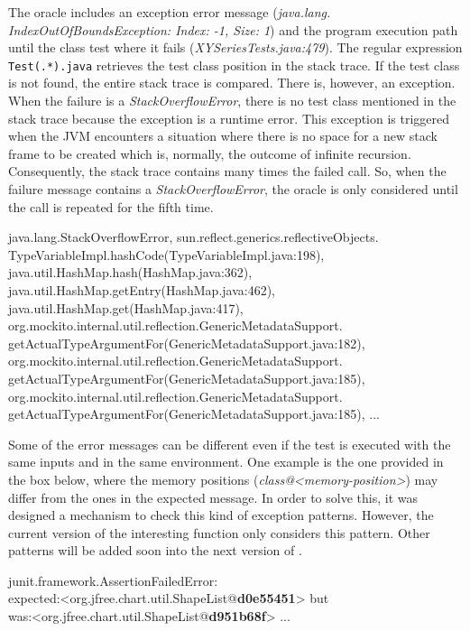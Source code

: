 \documentclass{article}
\begin{document}
The oracle includes an exception error message (\emph{java.lang.\\IndexOutOfBoundsException: Index: -1, Size: 1}) and the program execution path until the class test where it fails (\emph{XYSeriesTests.java:479}). The regular expression \verb/Test(.*).java/ retrieves the test class position in the stack trace. If the test class is not found, the entire stack trace is compared. There is, however, an exception. When the failure is a \emph{StackOverflowError}, there is no test class mentioned in the stack trace because the exception is a runtime error. This exception is triggered when the JVM encounters a situation where there is no space for a new stack frame to be created which is, normally, the outcome of infinite recursion. Consequently, the stack trace contains many times the failed call. So, when the failure message contains a \emph{StackOverflowError}, the oracle is only considered until the call is repeated for the fifth time.

\vspace{3mm}
\begin{myframe}
	java.lang.StackOverflowError,
	sun.reflect.generics.reflectiveObjects.\linebreak
			TypeVariableImpl.hashCode(TypeVariableImpl.java:198),
	java.util.HashMap.hash(HashMap.java:362),
	java.util.HashMap.getEntry(HashMap.java:462),
	java.util.HashMap.get(HashMap.java:417),  org.mockito.internal.util.reflection.GenericMetadataSupport.
		getActualTypeArgumentFor(GenericMetadataSupport.java:182), \linebreak
	org.mockito.internal.util.reflection.GenericMetadataSupport.
	getActualTypeArgumentFor(GenericMetadataSupport.java:185),
	org.mockito.internal.util.reflection.GenericMetadataSupport.
	getActualTypeArgumentFor(GenericMetadataSupport.java:185),
	...
\end{myframe}

Some of the error messages can be different even if the test is executed with the same inputs and in the same environment. One example is the one provided in the box below, where the memory positions (\emph{class@<memory-position>}) may differ from the ones in the expected message. In order to solve this, it was designed a mechanism to check this kind of exception patterns. However, the current version of the interesting function only considers this pattern. Other patterns will be added soon into the next version of \lithium{}.

\vspace{3mm}
\begin{myframe}
	junit.framework.AssertionFailedError: \\
	expected:<org.jfree.chart.util.ShapeList@\textbf{d0e55451}> but \\ was:<org.jfree.chart.util.ShapeList@\textbf{d951b68f}>
	...
\end{myframe}
\end{document}
